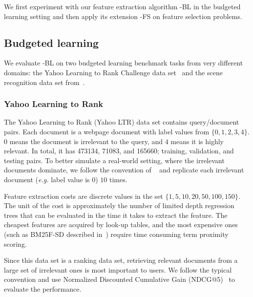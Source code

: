 
We first experiment with our feature extraction algorithm \name{}-BL in the budgeted learning setting and then apply its extension \name{}-FS on feature selection problems. 

\subsection{Budgeted learning}
We evaluate \name{}-BL on two budgeted learning benchmark tasks from very different domains: the Yahoo Learning to Rank Challenge data set~\citep{chapelle2011yahoo} and the scene recognition data set from~\citet{lazebnik2006beyond}. 

\subsubsection{Yahoo Learning to Rank} 
The Yahoo Learning to Rank (Yahoo LTR) data set contains query/document pairs. Each document is a webpage document with label values from $\{0,1,2,3,4\}$. $0$ means the document is irrelevant to the query, and $4$ means it is highly relevant. In total, it has 473134, 71083, and 165660; training, validation, and testing pairs. To better simulate a real-world setting, where the irrelevant documents dominate, we follow the convention of ~\citet{chen2011} and replicate each irrelevant document (\emph{e.g.} label value is $0$) $10$ times.

Feature extraction costs are discrete values in the set $\{1, 5, 10, 20, 50, 100, 150\}$. The unit of the cost is approximately the number of limited depth regression trees that can be evaluated in the time it takes to extract the feature. The cheapest features are acquired by look-up tables, and the most expensive ones (such as BM25F-SD described in~\citet{BroGabJos10}) require time consuming term proximity scoring.

Since this data set is a ranking data set, retrieving relevant documents from a large set of irrelevant ones is most important to users. We follow the typical convention and use Normalized Discounted Cumulative Gain (NDCG@5)~\citep{jarvelin2002cumulated} to evaluate the performance. 

